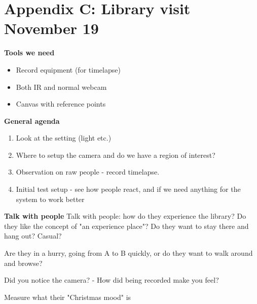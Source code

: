 \chapter{Appendix C: Library visit November 19}\label{targetgroup_visit}
\textbf{Tools we need}
\begin{itemize}
\item Record equipment (for timelapse)
\item Both IR and normal webcam
\item Canvas with reference points
\end{itemize}

\textbf{General agenda}
\begin{enumerate}
\item Look at the setting (light etc.)
\item Where to setup the camera and do we have a region of interest?
\item Observation on raw people - record timelapse.
\item Initial test setup - see how people react, and if we need anything for the system to work better
\end{enumerate}

\textbf{Talk with people}
Talk with people: how do they experience the library? Do they like the concept of "an experience place"? Do they want to stay there and hang out? Casual?

Are they in a hurry, going from A to B quickly, or do they want to walk around and browse?

Did you notice the camera?
- How did being recorded make you feel?

Measure what their "Christmas mood" is